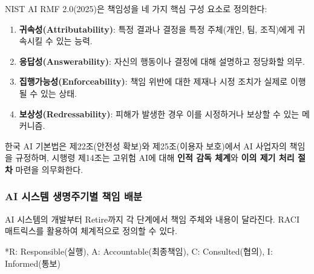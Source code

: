 NIST AI RMF 2.0(2025)은 책임성을 네 가지 핵심 구성 요소로 정의한다:
\begin{enumerate}
 \item \textbf{귀속성(Attributability)}: 특정 결과나 결정을 특정 주체(개인, 팀, 조직)에게 귀속시킬 수 있는 능력.
 \item \textbf{응답성(Answerability)}: 자신의 행동이나 결정에 대해 설명하고 정당화할 의무.
 \item \textbf{집행가능성(Enforceability)}: 책임 위반에 대한 제재나 시정 조치가 실제로 이행될 수 있는 상태.
 \item \textbf{보상성(Redressability)}: 피해가 발생한 경우 이를 시정하거나 보상할 수 있는 메커니즘.
\end{enumerate}

한국 AI 기본법은 제22조(안전성 확보)와 제25조(이용자 보호)에서 AI 사업자의 책임을 규정하며, 시행령 제14조는 고위험 AI에 대해 \textbf{인적 감독 체계}와 \textbf{이의 제기 처리 절차} 마련을 의무화한다.

\subsubsection*{AI 시스템 생명주기별 책임 배분}
AI 시스템의 개발부터 Retire까지 각 단계에서 책임 주체와 내용이 달라진다. RACI 매트릭스를 활용하여 체계적으로 정의할 수 있다.

\begin{table}[h]
\centering
\caption{AI 생명주기별 RACI 매트릭스 (대기업 기준, NIST AI RMF 2.0 정렬)}
\label{tab:raci-matrix}
\footnotesize{*R: Responsible(실행), A: Accountable(최종책임), C: Consulted(협의), I: Informed(통보)}
\end{table}

